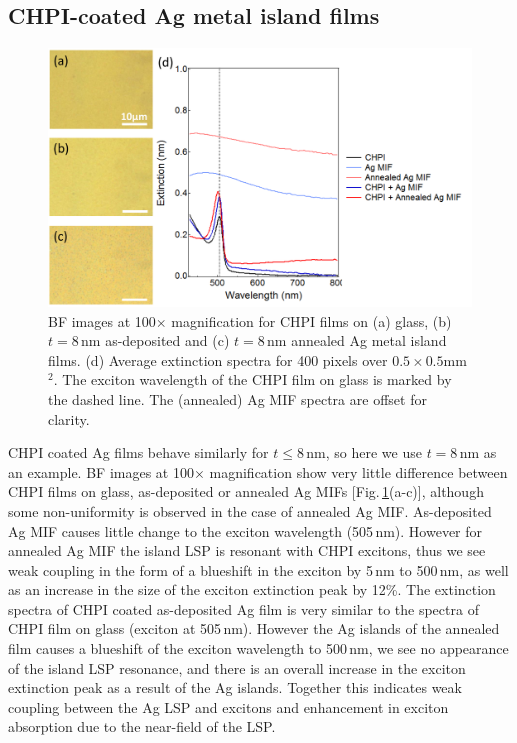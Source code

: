 \subsection{CHPI-coated Ag metal island films}
\begin{figure}[h!] 
\centering    
\includegraphics[width=\textwidth]{Fig7}
\caption{BF images at 100$\times$ magnification for CHPI films on (a) glass, (b) $t=8$\,nm as-deposited and (c) $t=8$\,nm annealed Ag metal island films. (d) Average extinction spectra for 400 pixels over $0.5\times0.5$mm$^2$. The exciton wavelength of the CHPI film on glass is marked by the dashed line. The (annealed) Ag MIF spectra are offset for clarity.}
\label{6Fig7}
\end{figure}
CHPI coated Ag films behave similarly for $t\leq8$\,nm, so here we use $t=8$\,nm as an example. BF images at 100$\times$ magnification show very little difference between CHPI films on glass, as-deposited or annealed Ag MIFs [Fig.\,\ref{6Fig7}(a-c)], although some non-uniformity is observed in the case of annealed Ag MIF. As-deposited Ag MIF causes little change to the exciton wavelength (505\,nm). However for annealed Ag MIF the island LSP is resonant with CHPI excitons, thus we see weak coupling in the form of a blueshift in the exciton by 5\,nm to 500\,nm, as well as an increase in the size of the exciton extinction peak by 12\%.
The extinction spectra of CHPI coated as-deposited Ag film is very similar to the spectra of CHPI film on glass (exciton at 505\,nm). However the Ag islands of the annealed film causes a blueshift of the exciton wavelength to 500\,nm, we see no appearance of the island LSP resonance, and there is an overall increase in the exciton extinction peak as a result of the Ag islands. Together this indicates weak coupling between the Ag LSP and excitons and enhancement in exciton absorption due to the near-field of the LSP. 

